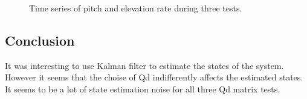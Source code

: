 \begin{figure}[h!]
    \centering
    \hfill
    \hfill
    \hfill
    \hfill
    \hfill
    \caption{Time series of pitch and elevation rate during three tests.}
    \label{fig:lab4_charts}
\end{figure}           


\subsection{Conclusion}
It was interesting to use Kalman filter to estimate the states of the system. However it seems that 
the choise of Qd indifferently affects the estimated states. It seems to be a lot of state estimation noise for all three Qd matrix tests.